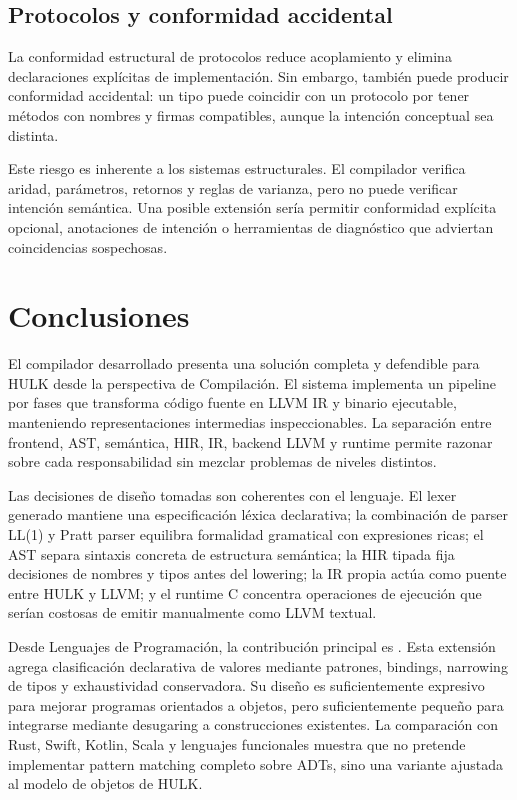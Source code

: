 \documentclass[12pt,letterpaper]{article}
\newcommand{\repo}[1]{\texttt{\detokenize{#1}}}
\newcommand{\hulk}{\textsc{HULK}}
\begin{document}
\subsection{Protocolos y conformidad accidental}

La conformidad estructural de protocolos reduce acoplamiento y elimina declaraciones explícitas de implementación. Sin embargo, también puede producir conformidad accidental: un tipo puede coincidir con un protocolo por tener métodos con nombres y firmas compatibles, aunque la intención conceptual sea distinta.

Este riesgo es inherente a los sistemas estructurales. El compilador verifica aridad, parámetros, retornos y reglas de varianza, pero no puede verificar intención semántica. Una posible extensión sería permitir conformidad explícita opcional, anotaciones de intención o herramientas de diagnóstico que adviertan coincidencias sospechosas.



\section{Conclusiones}

El compilador desarrollado presenta una solución completa y defendible para \hulk{} desde la perspectiva de Compilación. El sistema implementa un pipeline por fases que transforma código fuente en LLVM IR y binario ejecutable, manteniendo representaciones intermedias inspeccionables. La separación entre frontend, AST, semántica, HIR, IR, backend LLVM y runtime permite razonar sobre cada responsabilidad sin mezclar problemas de niveles distintos.

Las decisiones de diseño tomadas son coherentes con el lenguaje. El lexer generado mantiene una especificación léxica declarativa; la combinación de parser LL(1) y Pratt parser equilibra formalidad gramatical con expresiones ricas; el AST separa sintaxis concreta de estructura semántica; la HIR tipada fija decisiones de nombres y tipos antes del lowering; la IR propia actúa como puente entre \hulk{} y LLVM; y el runtime C concentra operaciones de ejecución que serían costosas de emitir manualmente como LLVM textual.

Desde Lenguajes de Programación, la contribución principal es \repo{match}. Esta extensión agrega clasificación declarativa de valores mediante patrones, bindings, narrowing de tipos y exhaustividad conservadora. Su diseño es suficientemente expresivo para mejorar programas orientados a objetos, pero suficientemente pequeño para integrarse mediante desugaring a construcciones existentes. La comparación con Rust, Swift, Kotlin, Scala y lenguajes funcionales muestra que \repo{match} no pretende implementar pattern matching completo sobre ADTs, sino una variante ajustada al modelo de objetos de \hulk{}.
\end{document}
